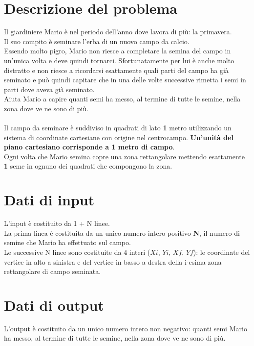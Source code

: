 \documentclass[a4paper,11pt]{article}
\begin{document}
\vspace{0.5cm}



\section*{Descrizione del problema}

Il giardiniere Mario è nel periodo dell'anno dove lavora di più: la primavera. \\
Il suo compito è seminare l'erba di un nuovo campo da calcio. \\
Essendo molto pigro, Mario non riesce a completare la semina del campo in un'unica volta e deve quindi tornarci. Sfortunatamente per lui è anche molto distratto e non riesce a ricordarsi esattamente quali parti del campo ha già seminato e può quindi capitare che in una delle volte successive rimetta i semi in parti dove aveva già seminato.\\
Aiuta Mario a capire quanti semi ha messo, al termine di tutte le semine, nella zona dove ve ne sono di più.\\\\
Il campo da seminare è suddiviso in quadrati di lato \textbf{1} metro utilizzando un sistema di coordinate cartesiane con origine nel centrocampo. \textbf{Un'unità del piano cartesiano corrisponde a 1 metro di campo}.\\
Ogni volta che Mario semina copre una zona rettangolare mettendo esattamente \textbf{1} seme in ognuno dei quadrati che compongono la zona.
\section*{Dati di input}
L'input è costituito da 1 + N linee.\\
La prima linea è costituita da un unico numero intero positivo \textbf{N}, il numero di semine che Mario ha effettuato sul campo.\\
Le successive N linee sono costituite da 4 interi ($Xi$, $Yi$, $Xf$, $Yf$): le coordinate del vertice in alto a sinistra e del vertice in basso a destra della i-esima zona rettangolare di campo seminata.

\section*{Dati di output}
  
L'output è costituito da un unico numero intero non negativo: quanti semi Mario ha messo, al termine di tutte le semine, nella zona dove ve ne sono di più.
\end{document}
